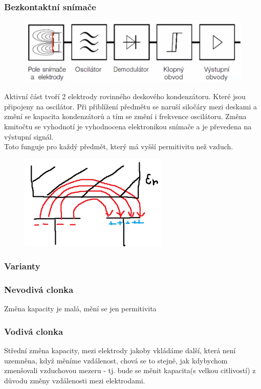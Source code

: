 \subsubsection{Bezkontaktní snímače}
\begin{figure} [h!]
    \centering
    \includegraphics[scale = 0.3]{img/BezkonKap.png}
\end{figure}
Aktivní část tvoří 2 elektrody rovinného deskového kondenzátoru. Které jsou připojeny na oscilátor. Při přiblížení předmětu se naruší siločáry mezi deskami a změní se kapacita kondenzátorů a tím se změní i frekvence oscilátoru. Změna kmitočtu se vyhodnotí je vyhodnocena elektronikou snímače a je převedena na výstupní signál.\\
Toto funguje pro každý předmět, který má vyšší permitivitu než vzduch.\\
\begin{figure} [h!]
    \centering
    \includegraphics[scale = 0.5]{img/BezkontC.png}
\end{figure}

\subsubsection{Varianty}
\subsubsection*{Nevodivá clonka}
Změna kapacity je malá, mění se jen permitivita
\subsubsection*{Vodivá clonka}
Střední změna kapacity, mezi elektrody jakoby vkládáme další, která není uzemněna, když měníme vzdálenost, chová se to stejně, jak kdybychom zmenšovali vzduchovou mezeru - tj. bude se měnit kapacita(s velkou citlivostí) z důvodu změny vzdálenosti mezi elektrodami.\\
